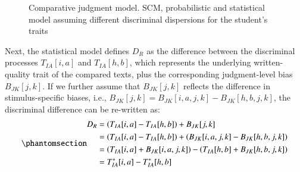 \documentclass[
  authoryear,
  review,
  1p]{elsarticle}
\begin{document}
\begin{figure}
\begin{minipage}[t]{0.33\linewidth}
\centering{

\[
\begin{aligned}
  O_{R} & \overset{iid}{\sim} \text{Bernoulli} \left[ \text{inv\_logit}( D_{R} ) \right] \\
  D_{R} & = \left( T_{IA}[i,a] - T_{IA}[h,b] \right) + B_{JK}[j,k] \\
  T_{IA} & = T_{I} + \beta_{XA} X_{IA} + e_{IA} \\
  T_{I} & = \beta_{XI} X_{I} + e_{I} \\
  B_{JK} & = B_{J} + \beta_{ZK} Z_{JK} + e_{JK} \\
  B_{J} & = \beta_{ZJ} Z_{J} + e_{J} \\ \\
  \boldsymbol{e} & \sim \text{Multi-Normal}( \boldsymbol{\mu}, \boldsymbol{\Sigma} )
  \\
  \boldsymbol{\Sigma} &= \boldsymbol{V} \boldsymbol{Q} \boldsymbol{V} \\ \\
\end{aligned}
\]

}


\end{minipage}%

\caption{\label{fig-cj16}Comparative judgment model. SCM, probabilistic
and statistical model assuming different discriminal dispersions for the
student's traits}

\end{figure}%

Next, the statistical model defines \(D_{R}\) as the difference between
the discriminal processes \(T_{IA}[i, a]\) and \(T_{IA}[h, b]\), which
represents the underlying written-quality trait of the compared texts,
plus the corresponding judgment-level bias \(B_{JK}[j, k]\). If we
further assume that \(B_{JK}[j,k]\) reflects the difference in
stimulus-specific biases, i.e.,
\(B_{JK}[j,k] = B_{JK}[i,a,j,k] - B_{JK}[h,b,j,k]\), the discriminal
difference can be re-written as:
\begin{equation}\protect\phantomsection\label{eq-mat52}{
\begin{aligned}
D_{R} &= \left( T_{IA}[i,a] - T_{IA}[h,b] \right) + B_{JK}[j,k] \\
&= \left( T_{IA}[i,a] - T_{IA}[h,b] \right) + \left( B_{JK}[i, a, j, k] - B_{JK}[h, b, j, k] \right) \\
&= \left( T_{IA}[i, a] + B_{JK}[i, a, j, k] \right) - \left( T_{IA}[h, b] + B_{JK}[h, b, j, k] \right) \\
& = T^{*}_{IA}[i,a] - T^{*}_{IA}[h,b]
\end{aligned}
}\end{equation}
\end{document}
